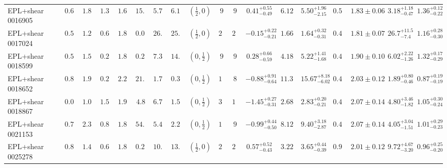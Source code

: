 \begin{longtable}{@{}lccccccccccccccccc@{}}
EPL+shear 0016905 & $0.64$ & $1.87$ & $1.39$ & $1.66$ & $15.8$ & $5.78$ & $6.15$ & $(\frac12,0)$ & $9$ & $9$ & $0.41^{+0.55}_{-0.49}$ & $6.12$ & $5.50^{+1.96}_{-2.15}$ & $0.54$ & $1.83\pm0.06$ & $3.18^{+1.18}_{-0.47}$ & $1.36^{+0.12}_{-0.22}$\\
EPL+shear 0017024 & $0.50$ & $1.21$ & $0.64$ & $1.83$ & $0.02$ & $26.7$ & $25.2$ & $(\frac12,0)$ & $20$ & $20$ & $-0.15^{+0.22}_{-0.21}$ & $1.66$ & $1.64^{+0.32}_{-0.31}$ & $0.40$ & $1.81\pm0.07$ & $26.7^{+11.5}_{-7.4}$ & $1.16^{+0.28}_{-0.30}$\\
EPL+shear 0018599 & $0.54$ & $1.52$ & $0.29$ & $1.81$ & $0.26$ & $7.35$ & $14.1$ & $(0,\frac12)$ & $9$ & $9$ & $0.28^{+0.66}_{-0.59}$ & $4.18$ & $5.22^{+1.41}_{-1.68}$ & $0.49$ & $1.90\pm0.10$ & $6.02^{+2.22}_{-1.26}$ & $1.32^{+0.17}_{-0.29}$\\
EPL+shear 0018652 & $0.88$ & $1.90$ & $0.24$ & $2.20$ & $21.6$ & $1.74$ & $0.35$ & $(0,\frac12)$ & $11$ & $8$ & $-0.88^{+0.91}_{-0.64}$ & $11.31$ & $15.67^{+8.18}_{-6.02}$ & $0.42$ & $2.03\pm0.12$ & $1.89^{+0.80}_{-0.46}$ & $0.87^{+0.19}_{-0.19}$\\
EPL+shear 0018867 & $0.02$ & $1.02$ & $1.59$ & $1.93$ & $4.8$ & $6.74$ & $1.58$ & $(0,\frac12)$ & $38$ & $12$ & $-1.45^{+0.27}_{-0.31}$ & $2.68$ & $2.83^{+0.20}_{-0.21}$ & $0.47$ & $2.07\pm0.14$ & $4.80^{+3.46}_{-1.82}$ & $1.05^{+0.30}_{-0.24}$\\
EPL+shear 0021153 & $0.77$ & $2.31$ & $0.80$ & $1.85$ & $54.9$ & $5.46$ & $2.22$ & $(0,\frac12)$ & $15$ & $9$ & $-0.99^{+0.44}_{-0.50}$ & $8.12$ & $9.40^{+3.18}_{-2.87}$ & $0.44$ & $2.07\pm0.14$ & $4.05^{+3.04}_{-1.51}$ & $1.01^{+0.29}_{-0.23}$\\
EPL+shear 0025278 & $0.82$ & $1.44$ & $0.60$ & $1.88$ & $0.24$ & $10.9$ & $13.0$ & $(\frac12,0)$ & $28$ & $24$ & $0.57^{+0.52}_{-0.43}$ & $3.22$ & $3.65^{+0.44}_{-0.39}$ & $0.99$ & $2.01\pm0.12$ & $9.72^{+4.67}_{-3.20}$ & $0.96^{+0.25}_{-0.20}$\\
\end{longtable}

